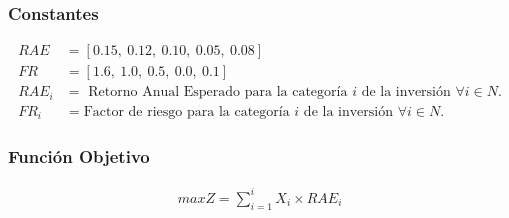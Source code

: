 \documentclass[a4paper,12pt]{article}
\begin{document}
\subsubsection{Constantes}
\begin{equation*}
\begin{split}
	RAE &= [0.15,\ 0.12,\ 0.10,\ 0.05,\ 0.08] \\
	FR & = [1.6,\ 1.0,\ 0.5,\ 0.0,\ 0.1] \\
	RAE_i &= \text{ Retorno Anual Esperado para la categoría } i \text{ de la inversión } \forall i \in N. \\
	FR_i &= \text{Factor de riesgo para la categoría } i \text{ de la inversión } \forall i \in N.
\end{split}
\end{equation*}
\subsubsection{Función Objetivo}
\begin{equation*}
\begin{split}
	maxZ = \sum_{i = 1}^{i}X_i\times RAE_i
\end{split}
\end{equation*}
\end{document}
